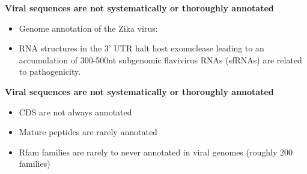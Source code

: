 \documentclass[landscape]{slides}
\begin{document}
\begin{slide}
\begin{center}
\textbf{Viral sequences are not systematically or thoroughly annotated}
\end{center}
\medskip

\small
\begin{itemize}
\item Genome annotation of the Zika virus:
\end{itemize}  


\begin{itemize}
\item RNA structures in the 3' UTR halt host exonuclease leading to an
  accumulation of 300-500nt subgenomic flavivirus RNAs (sfRNAs) are
  related to pathogenicity.
\end{itemize}

\normalsize
{}

\vfill
\tiny {}
\end{slide}
\begin{slide}
\begin{center}
\textbf{Viral sequences are not systematically or thoroughly annotated}
\end{center}

\small
\begin{itemize}
\item CDS are not always annotated
\item Mature peptides are rarely annotated
\item Rfam families are rarely to never annotated in viral genomes
  (roughly 200 families)
\end{itemize}

\normalsize
{}

\vfill
\end{slide}
\end{document}
